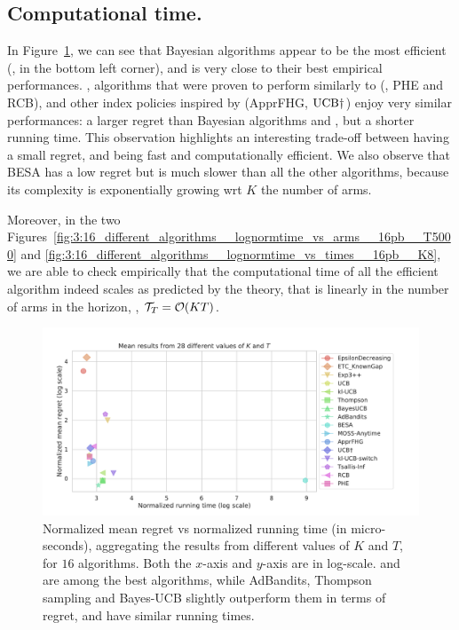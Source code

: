 \subsection{Computational time.}

In Figure~\ref{fig:3:16_different_algorithms__lognormregret_vs_logtime__28pb}, we can see that Bayesian algorithms appear to be the most efficient (\ie, in the bottom left corner), and \klUCB{} is very close to their best empirical performances.
\UCB, algorithms that were proven to perform similarly to \UCB{} (\ie, PHE and RCB), and other index policies inspired by \UCB{} (ApprFHG, $\mathrm{UCB}\dagger$) enjoy very similar performances: a larger regret than Bayesian algorithms and \klUCB, but a shorter running time.
%
This observation highlights an interesting trade-off between having a small regret, and being fast and computationally efficient.
%
We also observe that BESA has a low regret but is much slower than all the other algorithms, because its complexity is exponentially growing wrt $K$ the number of arms.

Moreover, in the two Figures~\ref{fig:3:16_different_algorithms__lognormtime_vs_arms__16pb__T5000} and
\ref{fig:3:16_different_algorithms__lognormtime_vs_times__16pb__K8},
we are able to check empirically that the computational time of all the efficient algorithm indeed scales as predicted by the theory, that is
linearly in the number of arms in the horizon, \ie, $\mathcal{T}_T = \mathop{}\mathopen{}\mathcal{O}\mathopen{}\left(KT\right)$.

\begin{figure}[h!]  %
	\includegraphics[width=1.10\linewidth]{16_different_algorithms__lognormregret_vs_logtime__28pb.pdf}
	\caption[Normalized mean regret vs normalized running time (in micro-seconds).]{
        Normalized mean regret vs normalized running time (in micro-seconds),
        aggregating the results from different values of $K$ and $T$, for $16$ algorithms.
        Both the $x$-axis and $y$-axis are in log-scale.
        \UCB{} and \klUCB{} are among the best algorithms, while AdBandits, Thompson sampling and Bayes-UCB slightly outperform them in terms of regret, and have similar running times.
	}
	\label{fig:3:16_different_algorithms__lognormregret_vs_logtime__28pb}
\end{figure}


